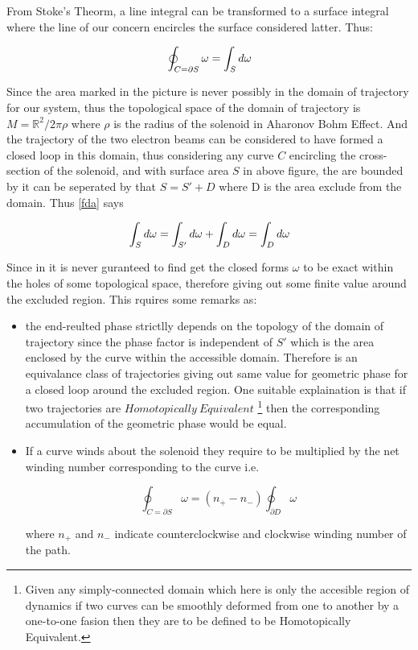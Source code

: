 \documentclass[8pt, twocoloumn]{article}
\begin{document}
From Stoke's Theorm, a line integral can be transformed to a surface integral where the line of our concern encircles the surface considered latter. Thus: 

\begin{align}{\label{fda}}
\oint_{C=\partial S}\omega = \int_{S}d\omega
\end{align}

Since the area marked in the picture is never possibly in the domain of trajectory for our system, thus the topological space of the domain of trajectory is $M = \mathbb{R}^2 / 2\pi\rho$ where $\rho$ is the radius of the solenoid in Aharonov Bohm Effect. And the trajectory of the two electron beams can be considered to have formed a closed loop in this domain, thus considering any curve $C$ encircling the cross-section of the solenoid, and with surface area $S$ in above figure, the are bounded by it can be seperated by that $S=S'+D$ where D is the area exclude from the domain. Thus \ref{fda} says 

\begin{align}{\label{fdhda}}
\int_{S}d\omega = \int_{S'}d\omega  + \int_{D}d\omega = \int_{D}d\omega 
\end{align}

Since in it is never guranteed to find get the closed forms $\omega$ to be exact within the holes of some topological space, therefore giving out some finite value around the excluded region. 
This rquires some remarks as: 

\begin{itemize}
\item the end-reulted phase strictlly depends on the topology of the domain of trajectory since the phase factor is independent of $S'$ which is the area enclosed by the curve within the accessible domain. Therefore is an equivalance class of trajectories giving out same value for geometric phase for a closed loop around the excluded region. 
One suitable explaination is \cite{pathAharonov} that if two trajectories are $Homotopically \ Equivalent$ \footnote{Given any simply-connected domain which here is only the accesible region of dynamics if two curves can be smoothly deformed from one to another by a one-to-one fasion then they are to be defined to be Homotopically Equivalent.} then the corresponding accumulation of the geometric phase would be equal. 

\item If a curve winds about the solenoid they require to be multiplied by the net winding number corresponding to the curve i.e. 

$$
\oint_{C=\partial S} \omega = (n_{+} - n_{-}) \oint _{\partial D} \omega
$$

where $n_+$ and $n_-$ indicate counterclockwise and clockwise winding number of the path.
\end{itemize}
\end{document}
